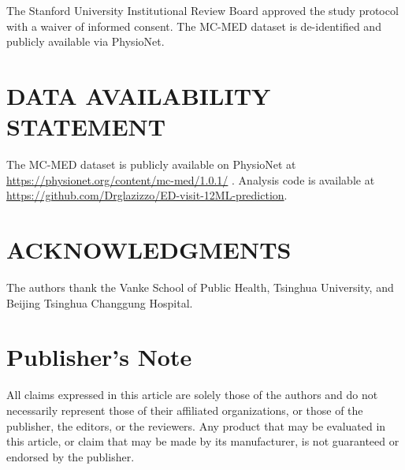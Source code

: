 \documentclass[harvard,article]{frontiersinFPHY_FAMS}
\begin{document}
The Stanford University Institutional Review Board approved the study protocol with a waiver of informed consent. The MC-MED dataset is de-identified and publicly available via PhysioNet.

\section{DATA AVAILABILITY STATEMENT}

The MC-MED dataset is publicly available on PhysioNet at \url{https://physionet.org/content/mc-med/1.0.1/} \cite{kansal2025}. Analysis code is available at \url{https://github.com/Drglazizzo/ED-visit-12ML-prediction}.

\section{ACKNOWLEDGMENTS}

The authors thank the Vanke School of Public Health, Tsinghua University, and Beijing Tsinghua Changgung Hospital.

\section{Publisher's Note}

All claims expressed in this article are solely those of the authors and do not necessarily represent those of their affiliated organizations, or those of the publisher, the editors, or the reviewers. Any product that may be evaluated in this article, or claim that may be made by its manufacturer, is not guaranteed or endorsed by the publisher.
\end{document}
